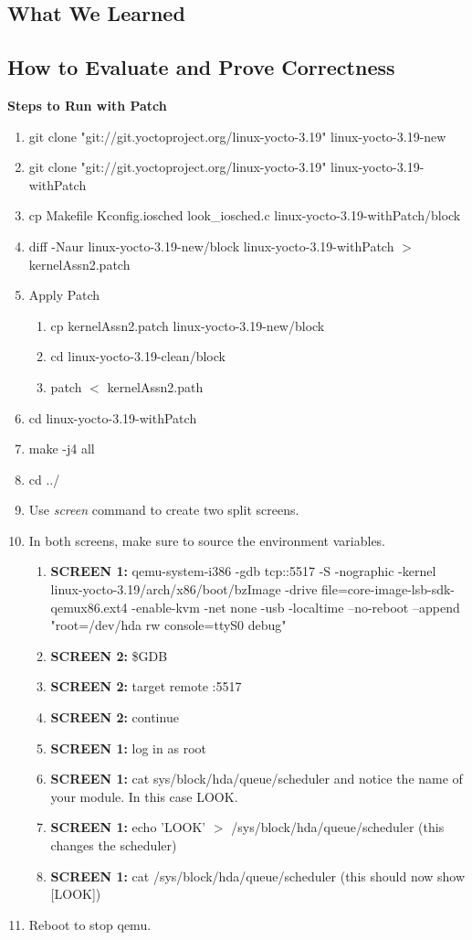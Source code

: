\documentclass[draftclsnofoot, onecolumn, 10pt, compsoc]{IEEEtran}
\begin{document}
		\subsection{What We Learned}

		\subsection{How to Evaluate and Prove Correctness}
			\textbf{Steps to Run with Patch}
			\begin{enumerate}
				\item git clone "git://git.yoctoproject.org/linux-yocto-3.19" linux-yocto-3.19-new
				\item git clone "git://git.yoctoproject.org/linux-yocto-3.19" linux-yocto-3.19-withPatch
				\item cp Makefile Kconfig.iosched look\_iosched.c linux-yocto-3.19-withPatch/block
				\item diff -Naur linux-yocto-3.19-new/block linux-yocto-3.19-withPatch $>$ kernelAssn2.patch
				\item Apply Patch
				\begin{enumerate}
					\item cp kernelAssn2.patch linux-yocto-3.19-new/block
					\item cd linux-yocto-3.19-clean/block
					\item patch $<$ kernelAssn2.path
				\end{enumerate}
				\item cd linux-yocto-3.19-withPatch
				\item make -j4 all
				\item cd ../
				\item Use \textit{screen} command to create two split screens.
				\item In both screens, make sure to source the environment variables.
				\begin{enumerate}
					\item \textbf{SCREEN 1:} qemu-system-i386 -gdb tcp::5517 -S -nographic -kernel linux-yocto-3.19/arch/x86/boot/bzImage -drive file=core-image-lsb-sdk-qemux86.ext4 -enable-kvm -net none -usb -localtime --no-reboot --append "root=/dev/hda rw console=ttyS0 debug"
					\item \textbf{SCREEN 2:} \$GDB
					\item \textbf{SCREEN 2:} target remote :5517
					\item \textbf{SCREEN 2:} continue
					\item \textbf{SCREEN 1:} log in as root
					\item \textbf{SCREEN 1:} cat sys/block/hda/queue/scheduler and notice the name of your module. In this case LOOK.
					\item \textbf{SCREEN 1:} echo 'LOOK' $>$ /sys/block/hda/queue/scheduler (this changes the scheduler)
					\item \textbf{SCREEN 1:} cat /sys/block/hda/queue/scheduler (this should now show [LOOK])
				\end{enumerate}
				\item Reboot to stop qemu.
			\end{enumerate}
	
	
\end{document}
